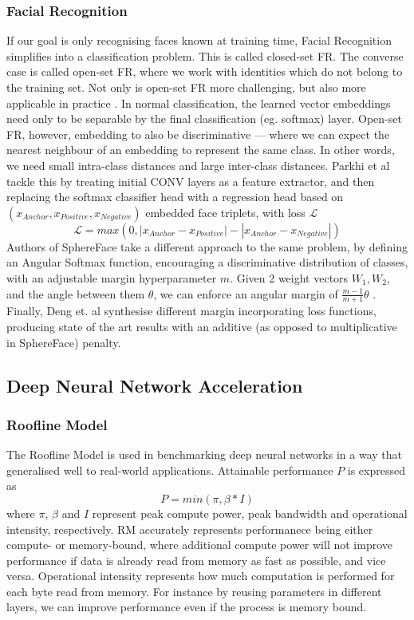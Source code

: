 \documentclass[12pt]{article}
\newcommand{\Loss}{\mathcal{L}}
\begin{document}
\subsubsection{Facial Recognition}
If our goal is only recognising faces known at training time, Facial Recognition simplifies
into a classification problem. This is called closed-set FR.
The converse case is called open-set FR, where we work with identities which do not belong to
the training set.
Not only is open-set FR more challenging, but also more applicable in practice
\cite{liu2017sphereface}.
In normal classification, the learned vector embeddings need only to be separable by the final
classification (eg. softmax) layer.
Open-set FR, however, embedding to also be discriminative --- where we can expect the nearest
neighbour of an embedding to represent the same class. In other words, we need small intra-class
distances and large inter-class distances\cite{deng2019arcface}.
Parkhi et al\cite{parkhi2015deep} tackle this by treating initial CONV layers as a feature
extractor, and then replacing the softmax classifier head with a regression head based on
$(x_{Anchor}, x_{Positive}, x_{Negative})$ embedded face triplets, with loss $\Loss$ $$\Loss =
max(0, |x_{Anchor} - x_{Positive}| - |x_{Anchor} - x_{Negative}|)$$
Authors of SphereFace\cite{liu2017sphereface} take a different approach to the same problem,
by defining an Angular Softmax function, encouraging a discriminative distribution of classes,
with an adjustable margin hyperparameter $m$.
Given 2 weight vectors $W_1, W_2$, and the angle between them $\theta$, we can enforce an
angular margin of $\frac{m-1}{m+1}\theta$ \cite{li2018angular}.
Finally, Deng et. al synthesise different margin incorporating loss functions, producing
state of the art results with an additive (as opposed to multiplicative in SphereFace)
penalty\cite{deng2019arcface}.

\subsection{Deep Neural Network Acceleration}
\subsubsection{Roofline Model}
The Roofline Model is used in benchmarking deep neural networks in a way that generalised well
to real-world applications.
Attainable performance $P$ is expressed as $$P = min(\pi, \beta * I)$$ where $\pi$, $\beta$
and $I$ represent peak compute power, peak bandwidth and operational intensity, respectively.
RM accurately represents performanece being either compute- or memory-bound, where additional
compute power will not improve performance if data is already read from memory as fast as
possible, and vice versa.
Operational intensity represents how much computation is performed for each byte read from memory.
For instance by reusing parameters in different layers, we can improve performance even if the
process is memory bound.
\end{document}
